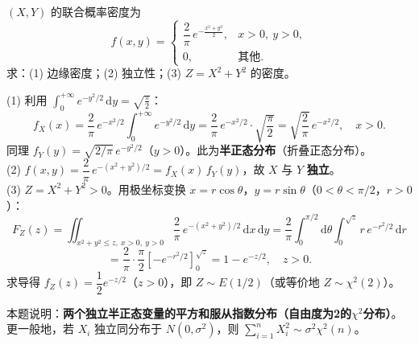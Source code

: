 \documentclass[lang=cn,11pt]{elegantbook}
\begin{document}
\begin{exercise}[半正态联合密度与极坐标变换] \label{exer:3-c13b}
$(X,Y)$ 的联合概率密度为
\[
f(x,y) = \begin{cases} \dfrac{2}{\pi}\,e^{-\frac{x^2+y^2}{2}}, & x>0,\ y>0, \\ 0, & \text{其他}. \end{cases}
\]
求：(1) 边缘密度；(2) 独立性；(3) $Z=X^2+Y^2$ 的密度。
\end{exercise}
\begin{solution}
(1) 利用 $\displaystyle\int_0^{+\infty}e^{-y^2/2}\,\mathrm{d}y = \sqrt{\frac{\pi}{2}}$：
\[
f_X(x) = \frac{2}{\pi}\,e^{-x^2/2}\int_0^{+\infty}e^{-y^2/2}\,\mathrm{d}y = \frac{2}{\pi}\,e^{-x^2/2}\cdot\sqrt{\frac{\pi}{2}} = \sqrt{\frac{2}{\pi}}\,e^{-x^2/2},\quad x>0.
\]
同理 $f_Y(y) = \sqrt{2/\pi}\,e^{-y^2/2}$（$y>0$）。此为\textbf{半正态分布}（折叠正态分布）。\\
(2) $f(x,y) = \dfrac{2}{\pi}\,e^{-(x^2+y^2)/2} = f_X(x)\,f_Y(y)$，故 $X$ 与 $Y$ \textbf{独立}。\\
(3) $Z=X^2+Y^2 > 0$。用极坐标变换 $x=r\cos\theta$，$y=r\sin\theta$（$0<\theta<\pi/2$，$r>0$）：
\[
F_Z(z) = \iint_{x^2+y^2 \leqslant z,\ x>0,\ y>0}\frac{2}{\pi}\,e^{-(x^2+y^2)/2}\,\mathrm{d}x\,\mathrm{d}y = \frac{2}{\pi}\int_0^{\pi/2}\mathrm{d}\theta\int_0^{\sqrt{z}}r\,e^{-r^2/2}\,\mathrm{d}r
\]
\[
= \frac{2}{\pi}\cdot\frac{\pi}{2}\left[-e^{-r^2/2}\right]_0^{\sqrt{z}} = 1-e^{-z/2},\quad z>0.
\]
求导得 $f_Z(z) = \dfrac{1}{2}e^{-z/2}$（$z>0$），即 $Z \sim E(1/2)$（或等价地 $Z\sim\chi^2(2)$）。
\begin{note}
本题说明：\textbf{两个独立半正态变量的平方和服从指数分布（自由度为2的$\chi^2$分布）}。更一般地，若 $X_i$ 独立同分布于 $N(0,\sigma^2)$，则 $\sum_{i=1}^n X_i^2 \sim \sigma^2\chi^2(n)$。
\end{note}
\end{solution}
\end{document}
